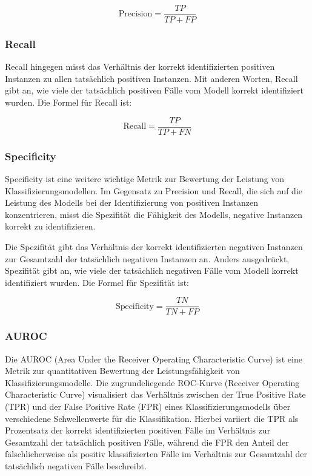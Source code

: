 \begin{equation}
    \text{Precision} = \frac{TP}{TP + FP}
    \label{eq:PrecisionFormula}
\end{equation}


\subsubsection{Recall}

Recall hingegen misst das Verhältnis der korrekt identifizierten positiven Instanzen zu allen tatsächlich positiven Instanzen. Mit anderen Worten, Recall gibt an, wie viele der tatsächlich positiven Fälle vom Modell korrekt identifiziert wurden. Die Formel für Recall ist:

\begin{equation}
    \text{Recall} = \frac{TP}{TP + FN}
    \label{eq:RecallFormula}
\end{equation}

\subsubsection{Specificity}
Specificity ist eine weitere wichtige Metrik zur Bewertung der Leistung von Klassifizierungsmodellen. Im Gegensatz zu Precision und Recall, die sich auf die Leistung des Modells bei der Identifizierung von positiven Instanzen konzentrieren, misst die Spezifität die Fähigkeit des Modells, negative Instanzen korrekt zu identifizieren.

Die Spezifität gibt das Verhältnis der korrekt identifizierten negativen Instanzen zur Gesamtzahl der tatsächlich negativen Instanzen an. Anders ausgedrückt, Spezifität gibt an, wie viele der tatsächlich negativen Fälle vom Modell korrekt identifiziert wurden. Die Formel für Spezifität ist:

\begin{equation}
    \text{Specificity} = \frac{TN}{TN + FP}
    \label{eq:SpecificityFormula}
\end{equation}

\subsubsection{AUROC}
Die AUROC (Area Under the Receiver Operating Characteristic Curve) ist eine Metrik zur quantitativen Bewertung der Leistungsfähigkeit von Klassifizierungsmodelle. Die zugrundeliegende ROC-Kurve (Receiver Operating Characteristic Curve) visualisiert das Verhältnis zwischen der True Positive Rate (TPR) und der False Positive Rate (FPR) eines Klassifizierungsmodells über verschiedene Schwellenwerte für die Klassifikation. Hierbei variiert die TPR als Prozentsatz der korrekt identifizierten positiven Fälle im Verhältnis zur Gesamtzahl der tatsächlich positiven Fälle, während die FPR den Anteil der fälschlicherweise als positiv klassifizierten Fälle im Verhältnis zur Gesamtzahl der tatsächlich negativen Fälle beschreibt.

